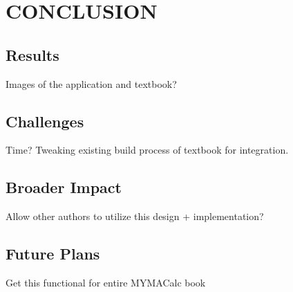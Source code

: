 %
%
%
%

\chapter{CONCLUSION}

\section{Results}

Images of the application and textbook?

\section{Challenges}

Time? Tweaking existing build process of textbook for integration.

\section{Broader Impact}

Allow other authors to utilize this design + implementation?

\section{Future Plans}

Get this functional for entire MYMACalc book
